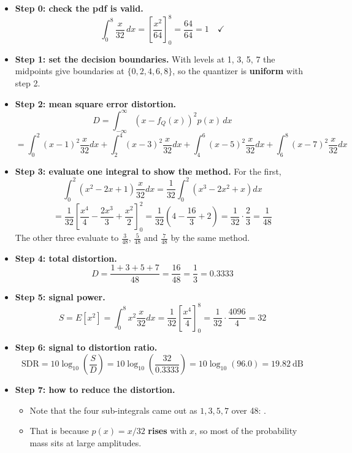 \begin{itemize}
  \item \textbf{Step 0: check the pdf is valid.}
        \[ \int_0^8 \frac{x}{32}\,dx = \left[\frac{x^2}{64}\right]_0^8 = \frac{64}{64} = 1
           \quad\checkmark \]
  \item \textbf{Step 1: set the decision boundaries.} With levels at 1, 3, 5, 7 the midpoints give
        boundaries at $\{0, 2, 4, 6, 8\}$, so the quantizer is \textbf{uniform} with step 2.
  \item \textbf{Step 2: mean square error distortion.}
        \[ D = \int_{-\infty}^{\infty}\left(x - f_Q(x)\right)^2 p(x)\,dx \]
        \[ = \int_0^2 (x-1)^2\frac{x}{32}dx + \int_2^4 (x-3)^2\frac{x}{32}dx
          + \int_4^6 (x-5)^2\frac{x}{32}dx + \int_6^8 (x-7)^2\frac{x}{32}dx \]
  \item \textbf{Step 3: evaluate one integral to show the method.} For the first,
        \[ \int_0^2 (x^2-2x+1)\frac{x}{32}dx
           = \frac{1}{32}\int_0^2 \left(x^3 - 2x^2 + x\right)dx \]
        \[ = \frac{1}{32}\left[\frac{x^4}{4} - \frac{2x^3}{3} + \frac{x^2}{2}\right]_0^2
           = \frac{1}{32}\left(4 - \frac{16}{3} + 2\right)
           = \frac{1}{32}\cdot\frac{2}{3} = \frac{1}{48} \]
        The other three evaluate to $\tfrac{3}{48}$, $\tfrac{5}{48}$ and $\tfrac{7}{48}$ by the
        same method.
  \item \textbf{Step 4: total distortion.}
        \[ D = \frac{1+3+5+7}{48} = \frac{16}{48} = \frac{1}{3}
             = \boxed{0.3333} \]
  \item \textbf{Step 5: signal power.}
        \[ S = E[x^2] = \int_0^8 x^2 \frac{x}{32}dx = \frac{1}{32}\left[\frac{x^4}{4}\right]_0^8
             = \frac{1}{32}\cdot\frac{4096}{4} = \boxed{32} \]
  \item \textbf{Step 6: signal to distortion ratio.}
        \[ \text{SDR} = 10\log_{10}\!\left(\frac{S}{D}\right)
                      = 10\log_{10}\!\left(\frac{32}{0.3333}\right)
                      = 10\log_{10}(96.0) = \boxed{19.82\ \text{dB}} \]
  \item \textbf{Step 7: how to reduce the distortion.}
  \begin{itemize}
    \item Note that the four sub-integrals came out as $1,3,5,7$ over 48:
          .
    \item That is because $p(x) = x/32$ \textbf{rises} with $x$, so most of the probability mass
          sits at large amplitudes.

\end{itemize}
\end{itemize}
